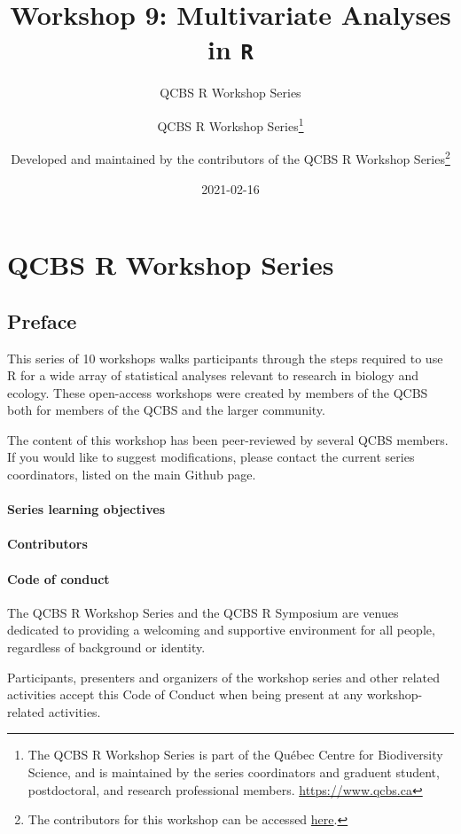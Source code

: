 \documentclass[
]{book}
\title{Workshop 9: Multivariate Analyses in \texttt{R}}
\subtitle{QCBS R Workshop Series}
\author{QCBS R Workshop Series\footnote{The QCBS R Workshop Series is part of the Québec Centre for Biodiversity Science, and is maintained by the series coordinators and graduent student, postdoctoral, and research professional members. \url{https://www.qcbs.ca}} \and Developed and maintained by the contributors of the QCBS R Workshop Series\footnote{The contributors for this workshop can be accessed \href{link}{here}.}}
\date{2021-02-16}
\begin{document}
\maketitle

{
\setcounter{tocdepth}{1}
\tableofcontents
}
\hypertarget{part-qcbs-r-workshop-series}{%
\part{QCBS R Workshop Series}\label{part-qcbs-r-workshop-series}}

\hypertarget{preface}{%
\chapter*{Preface}\label{preface}}

This series of 10 workshops walks participants through the steps required to use R for a wide array of statistical analyses relevant to research in biology and ecology. These open-access workshops were created by members of the QCBS both for members of the QCBS and the larger community.

The content of this workshop has been peer-reviewed by several QCBS members. If you would like to suggest modifications, please contact the current series coordinators, listed on the main Github page.

\hypertarget{series-learning-objectives}{%
\subsection{Series learning objectives}\label{series-learning-objectives}}

\hypertarget{contributors}{%
\subsection{Contributors}\label{contributors}}

\hypertarget{code-of-conduct}{%
\subsection{Code of conduct}\label{code-of-conduct}}

The QCBS R Workshop Series and the QCBS R Symposium are venues dedicated to providing a welcoming and supportive environment for all people, regardless of background or identity.

Participants, presenters and organizers of the workshop series and other related activities accept this Code of Conduct when being present at any workshop-related activities.
\end{document}
